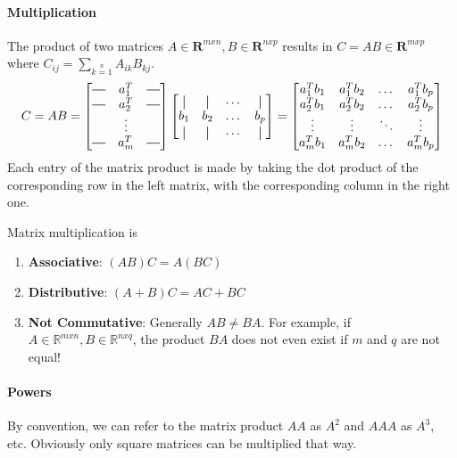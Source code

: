 \documentclass{article}
\newcommand*{\vertbar}{\rule[-1ex]{0.5pt}{2.5ex}} %
\newcommand*{\horzbar}{\rule[.5ex]{2.5ex}{0.5pt}}
\begin{document}
\paragraph{Multiplication} The product of two matrices $A\in \mathbf{R}^{mxn}, B\in \mathbf{R}^{nxp}$ results in $C = AB \in \mathbf{R}^{mxp}$ where $C_{ij} = \sum\limits_{k=1}\limits^{n}{A_{ik}B_{kj}}$.
\[C = AB = \begin{bmatrix}
     \horzbar & a_{1}^{T} & \horzbar \\
     \horzbar & a_{2}^{T} & \horzbar \\
     & \vdots &  \\
    \horzbar & a_{m}^{T} & \horzbar
\end{bmatrix}
\begin{bmatrix}
    \vertbar & \vertbar & \dots & \vertbar \\
    b_{1} & b_{2} &  \dots  & b_{p} \\
    \vertbar & \vertbar & \dots & \vertbar
\end{bmatrix}
=
\begin{bmatrix}
    a_{1}^{T}b_{1} & a_{1}^{T}b_{2} & \dots  & a_{1}^{T}b_{p} \\
    a_{2}^{T}b_{1} & a_{2}^{T}b_{2} &  \dots  & a_{2}^{T}b_{p} \\
    \vdots & \vdots &  \ddots & \vdots \\
    a_{m}^{T}b_{1} & a_{m}^{T}b_{2} &  \dots  & a_{m}^{T}b_{p}
\end{bmatrix}\]
Each entry of the matrix product is made by taking the dot product of the corresponding row in the left matrix, with the corresponding column in the right one.

Matrix multiplication is
\begin{enumerate}
  \item \textbf{Associative}: $(AB)C = A(BC)$
  \item \textbf{Distributive}: $(A+B)C = AC + BC$
  \item \textbf{Not Commutative}: Generally $AB \neq BA$. For example, if $A\in \mathbb{R}^{mxn}, B \in \mathbb{R}^{nxq}$, the product $BA$ does not even exist if $m$ and $q$ are not equal!
\end{enumerate}

\paragraph{Powers} By convention, we can refer to the matrix product $AA$ as $A^2$ and $AAA$ as $A^3$, etc. Obviously only square matrices can be multiplied that way.
\end{document}
